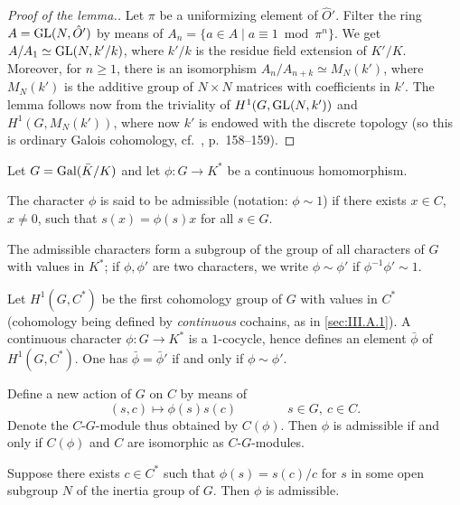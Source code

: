 \begin{proof}[Proof of the lemma.]
Let $\pi$ be a uniformizing element of $\hat O'$.  Filter the ring
$A=\mathrm{GL}(N,\hat O')$ by means of
$A_n=\{a\in A \mid a\equiv 1 \bmod \pi^n\}$.  We get
$A/A_1\simeq\mathrm{GL}(N,k'/k)$, where $k'/k$ is the residue field extension
of $K'/K$.  Moreover, for $n\geq 1$, there is an isomorphism
$A_n/A_{n+k}\simeq M_N(k')$, where $M_N(k')$ is the additive group of
$N\times N$ matrices with coefficients in $k'$.  The lemma follows now
from the triviality of $H^1(G,\mathrm{GL}(N,k'))$ and $H^1(G,M_N(k'))$, where
now $k'$ is endowed with the discrete topology (so this is ordinary
Galois cohomology, cf.~\cite{serre-corps}, p.~158--159).
\end{proof}


Let $G=\mathrm{Gal}(\bar K/K)$ and let $\phi\colon G\to K^*$ be a continuous
homomorphism.

\begin{dfn}
The character $\phi$ is said to be admissible (notation: $\phi\sim 1$)
if there exists $x\in C$, $x\neq 0$, such that $s(x)=\phi(s)x$ for all
$s\in G$.
\end{dfn}

\begin{remarks}
\begin{nlist}
\item The admissible characters form a subgroup of the group of all
characters of $G$ with values in $K^*$; if $\phi,\phi'$ are two
characters, we write $\phi\sim\phi'$ if $\phi^{-1}\phi'\sim 1$.
\item Let $H^1(G,C^*)$ be the first cohomology group of $G$ with values
in $C^*$ (cohomology being defined by \emph{continuous} cochains, as in
\ref{sec:III.A.1}).  A continuous character $\phi\colon G\to K^*$ is a
$1$-cocycle, hence defines an element $\bar\phi$ of $H^1(G,C^*)$.  One
has $\bar\phi=\bar\phi'$ if and only if $\phi\sim\phi'$.
\item Define a new action of $G$ on $C$ by means of
\[
(s,c)\mapsto \phi(s)s(c)\qquad\qquad s\in G,\ c\in C.
\]
Denote the $C$-$G$-module thus obtained by $C(\phi)$.  Then $\phi$ is
admissible if and only if $C(\phi)$ and $C$ are isomorphic as
$C$-$G$-modules.
\end{nlist}
\end{remarks}

\begin{proposition}[1]\label{prop:III.A.2.1}
Suppose there exists $c\in C^*$ such that $\phi(s)=s(c)/c$ for $s$ in
some open subgroup $N$ of the inertia group of $G$.  Then $\phi$ is
admissible.
\end{proposition}

